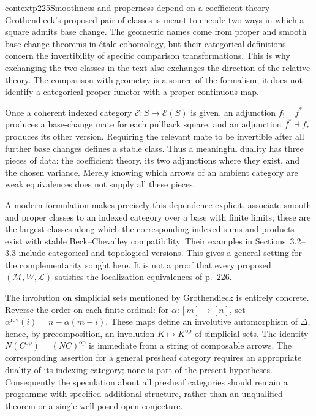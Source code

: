 \begin{dcomment}{context}{p225}{Smoothness and properness depend on a coefficient theory}
Grothendieck's proposed pair of classes is meant to encode two ways in which a square admits base change. The geometric names come from proper and smooth base-change theorems in étale cohomology, but their categorical definitions concern the invertibility of specific comparison transformations. This is why exchanging the two classes in the text also exchanges the direction of the relative theory. The comparison with geometry is a source of the formalism; it does not identify a categorical proper functor with a proper continuous map.

Once a coherent indexed category $\mathscr E:S\mapsto\mathscr E(S)$ is given, an adjunction $f_!\dashv f^*$ produces a base-change mate for each pullback square, and an adjunction $f^*\dashv f_*$ produces its other version. Requiring the relevant mate to be invertible after all further base changes defines a stable class. Thus a meaningful duality has three pieces of data: the coefficient theory, its two adjunctions where they exist, and the chosen variance. Merely knowing which arrows of an ambient category are weak equivalences does not supply all these pieces.

A modern formulation makes precisely this dependence explicit. \citet[Definition 9 and Proposition 10]{AnelWeinberger2024} associate smooth and proper classes to an indexed category over a base with finite limits; these are the largest classes along which the corresponding indexed sums and products exist with stable Beck--Chevalley compatibility. Their examples in Sections~3.2--3.3 include categorical and topological versions. This gives a general setting for the complementarity sought here. It is not a proof that every proposed $(\mathcal M,W,\mathcal L)$ satisfies the localization equivalences of p.~226.

The involution on simplicial sets mentioned by Grothendieck is entirely concrete. Reverse the order on each finite ordinal: for $\alpha:[m]\to[n]$, set $\alpha^{\mathrm{rev}}(i)=n-\alpha(m-i)$. These maps define an involutive automorphism of $\Delta$, hence, by precomposition, an involution $K\mapsto K^{\mathrm{op}}$ of simplicial sets. The identity $N(C^{\mathrm{op}})=(NC)^{\mathrm{op}}$ is immediate from a string of composable arrows. The corresponding assertion for a general presheaf category requires an appropriate duality of its indexing category; none is part of the present hypotheses. Consequently the speculation about all presheaf categories should remain a programme with specified additional structure, rather than an unqualified theorem or a single well-posed open conjecture.


\end{dcomment}
